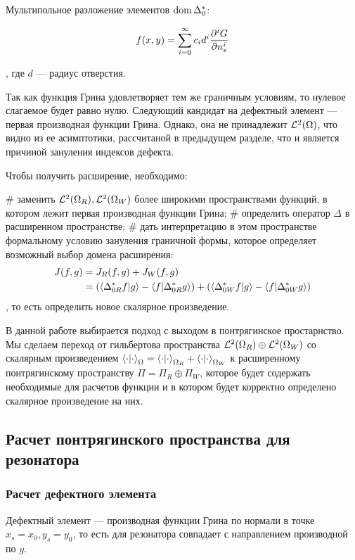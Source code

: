 
Мультипольное разложение элементов $\operatorname{dom} \Delta_0^*$:

\[
f(x, y) = \sum\limits_{i = 0}^\infty c_i d^i \pdv[i]{G}{n_s} (x, y, x_0, y_0; E_0)
\]

, где $d$ — радиус отверстия.

Так как функция Грина удовлетворяет тем же граничным условиям, то нулевое слагаемое будет равно нулю. Следующий кандидат на дефектный элемент — первая производная функции Грина. Однако, она не принадлежит $\mathcal{L}^2(\Omega)$, что видно из ее асимптотики, рассчитаной в предыдущем разделе, что и является причиной зануления индексов дефекта.

Чтобы получить расширение, необходимо:
\begin{ilist}
# заменить $\mathcal{L}^2(\Omega_R), \mathcal{L}^2(\Omega_W)$ более широкими пространствами функций, в котором лежит первая производная функции Грина;
# определить оператор $\Delta$ в расширенном пространстве;
# дать интерпретацию в этом пространстве формальному условию зануления граничной формы, которое определяет возможный выбор домена расширения:
\begin{align*}
J(f, g)
& = J_R(f, g) + J_W(f, g) \\
& = (\ip{\Delta_{0R}^* f}{g} - \ip{f}{\Delta_{0R}^* g}) + (\ip{\Delta_{0W}^* f}{g} - \ip{f}{\Delta_{0W}^* g})
\end{align*}
, то есть определить новое скалярное произведение.
\end{ilist}
В данной работе выбирается подход с выходом в понтрягинское простарнство. Мы сделаем переход от гильбертова пространства $\mathcal{L}^2(\Omega_R) \oplus \mathcal{L}^2(\Omega_W)$ со скалярным произведением $\ipcdot_\Omega = \ipcdot_{\Omega_R} + \ipcdot_{\Omega_W}$ к расширенному понтрягинскому пространству $\Pi = \Pi_R \oplus \Pi_W$, которое будет содержать необходимые для расчетов функции и в котором будет корректно определено скалярное произведение на них.

\subsection{Расчет понтрягинского пространства для резонатора}
\subsubsection{Расчет дефектного элемента}

Дефектный элемент — производная функции Грина по нормали в точке $x_s = x_0, y_s = y_0$, то есть для резонатора совпадает с направлением производной по $y$.

